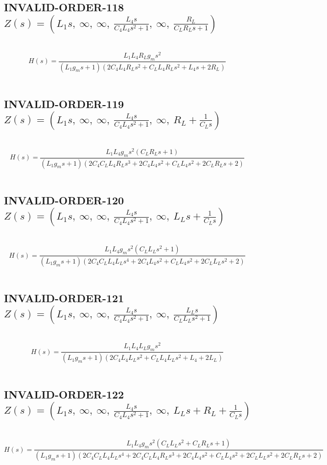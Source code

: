 \documentclass{article}
\begin{document}
\subsection{INVALID-ORDER-118 $Z(s) = \left( L_{1} s, \  \infty, \  \infty, \  \frac{L_{4} s}{C_{4} L_{4} s^{2} + 1}, \  \infty, \  \frac{R_{L}}{C_{L} R_{L} s + 1}\right)$ } \ 
\textbf{\[H(s) = \frac{L_{1} L_{4} R_{L} g_{m} s^{2}}{\left(L_{1} g_{m} s + 1\right) \left(2 C_{4} L_{4} R_{L} s^{2} + C_{L} L_{4} R_{L} s^{2} + L_{4} s + 2 R_{L}\right)}\] } \ 
\subsection{INVALID-ORDER-119 $Z(s) = \left( L_{1} s, \  \infty, \  \infty, \  \frac{L_{4} s}{C_{4} L_{4} s^{2} + 1}, \  \infty, \  R_{L} + \frac{1}{C_{L} s}\right)$ } \ 
\textbf{\[H(s) = \frac{L_{1} L_{4} g_{m} s^{2} \left(C_{L} R_{L} s + 1\right)}{\left(L_{1} g_{m} s + 1\right) \left(2 C_{4} C_{L} L_{4} R_{L} s^{3} + 2 C_{4} L_{4} s^{2} + C_{L} L_{4} s^{2} + 2 C_{L} R_{L} s + 2\right)}\] } \ 
\subsection{INVALID-ORDER-120 $Z(s) = \left( L_{1} s, \  \infty, \  \infty, \  \frac{L_{4} s}{C_{4} L_{4} s^{2} + 1}, \  \infty, \  L_{L} s + \frac{1}{C_{L} s}\right)$ } \ 
\textbf{\[H(s) = \frac{L_{1} L_{4} g_{m} s^{2} \left(C_{L} L_{L} s^{2} + 1\right)}{\left(L_{1} g_{m} s + 1\right) \left(2 C_{4} C_{L} L_{4} L_{L} s^{4} + 2 C_{4} L_{4} s^{2} + C_{L} L_{4} s^{2} + 2 C_{L} L_{L} s^{2} + 2\right)}\] } \ 
\subsection{INVALID-ORDER-121 $Z(s) = \left( L_{1} s, \  \infty, \  \infty, \  \frac{L_{4} s}{C_{4} L_{4} s^{2} + 1}, \  \infty, \  \frac{L_{L} s}{C_{L} L_{L} s^{2} + 1}\right)$ } \ 
\textbf{\[H(s) = \frac{L_{1} L_{4} L_{L} g_{m} s^{2}}{\left(L_{1} g_{m} s + 1\right) \left(2 C_{4} L_{4} L_{L} s^{2} + C_{L} L_{4} L_{L} s^{2} + L_{4} + 2 L_{L}\right)}\] } \ 
\subsection{INVALID-ORDER-122 $Z(s) = \left( L_{1} s, \  \infty, \  \infty, \  \frac{L_{4} s}{C_{4} L_{4} s^{2} + 1}, \  \infty, \  L_{L} s + R_{L} + \frac{1}{C_{L} s}\right)$ } \ 
\textbf{\[H(s) = \frac{L_{1} L_{4} g_{m} s^{2} \left(C_{L} L_{L} s^{2} + C_{L} R_{L} s + 1\right)}{\left(L_{1} g_{m} s + 1\right) \left(2 C_{4} C_{L} L_{4} L_{L} s^{4} + 2 C_{4} C_{L} L_{4} R_{L} s^{3} + 2 C_{4} L_{4} s^{2} + C_{L} L_{4} s^{2} + 2 C_{L} L_{L} s^{2} + 2 C_{L} R_{L} s + 2\right)}\] } \ 
\end{document}
